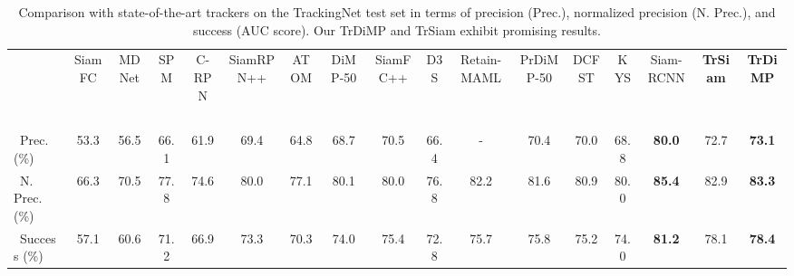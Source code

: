 \documentclass[10pt,twocolumn,letterpaper]{article}
\begin{document}
\setlength{\tabcolsep}{2pt}
\begin{table*}[t]
	\scriptsize
	\begin{center}
		\caption{Comparison with state-of-the-art trackers on the TrackingNet test set \cite{2018trackingnet} in terms of precision (Prec.), normalized precision (N. Prec.), and success (AUC score). Our TrDiMP and TrSiam exhibit promising results.} \label{table:trackingnet}	
		\begin{tabular*}{17.6 cm} {@{\extracolsep{\fill}}lcccccccccccccccc}
			\hline
			~  &SiamFC &MDNet &SPM &C-RPN &SiamRPN++ &ATOM &DiMP-50 &SiamFC++ &D3S &Retain-MAML &PrDiMP-50 &DCFST &KYS &Siam-RCNN &{\bf TrSiam} &{\bf TrDiMP}\\
			~  &\cite{SiamFC}  &\cite{MDNet} &\cite{SPM} &\cite{CRPN} &\cite{siamrpn++} &\cite{ATOM} &\cite{DiMP} &\cite{SiamFC++} &\cite{D3S} &\cite{MAML} &\cite{PrDiMP} &\cite{DCFST} &\cite{KYS} &\cite{SiamRCNN} & & \\
			\hline
			~Prec. (\%) &53.3  &56.5  &66.1 &61.9 &69.4 &64.8 &68.7 &70.5 &66.4 &- &70.4 &70.0 &68.8 &{\bf \color{red} 80.0} &{ 72.7} &{\bf \color{blue} 73.1}\\
			
			~N. Prec. (\%)  &66.3  &70.5 &77.8 &74.6 &80.0 &77.1 &80.1 &80.0 &76.8 &82.2 &81.6 &80.9 &80.0 &{\bf \color{red} 85.4} &{ 82.9} &{\bf \color{blue} 83.3}\\
			
			~Success (\%)  &57.1  &60.6 &71.2 &66.9 &73.3 &70.3 &74.0 &75.4 &72.8 &75.7 &75.8 &75.2 &74.0 &{\bf \color{red} 81.2} &{ 78.1} &{\bf \color{blue} 78.4}\\
			\hline
		\end{tabular*}
	\end{center}
	\vspace{-0.15in}
\end{table*}
\end{document}
